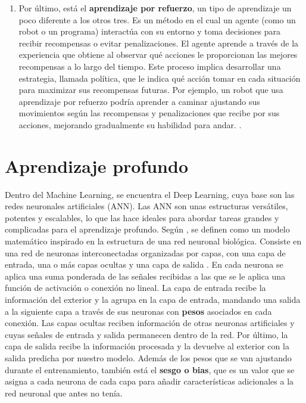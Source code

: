 \begin{enumerate}
	\item Por último, está el \textbf{aprendizaje por refuerzo}, un tipo de aprendizaje un poco diferente a los otros tres. Es un método en el cual un agente (como un robot o un programa) interactúa con su entorno y toma decisiones para recibir recompensas o evitar penalizaciones. El agente aprende a través de la experiencia que obtiene al observar qué acciones le proporcionan las mejores recompensas a lo largo del tiempo. Este proceso implica desarrollar una estrategia, llamada política, que le indica qué acción tomar en cada situación para maximizar sus recompensas futuras. Por ejemplo, un robot que usa aprendizaje por refuerzo podría aprender a caminar ajustando sus movimientos según las recompensas y penalizaciones que recibe por sus acciones, mejorando gradualmente su habilidad para andar. \citep{geron2022hands}.
\end{enumerate}


\section{Aprendizaje profundo}

Dentro del Machine Learning, se encuentra el Deep Learning, cuya base son las redes neuronales artificiales (ANN). Las ANN son unas estructuras versátiles, potentes y escalables, lo que las hace ideales para abordar tareas grandes y complicadas para el aprendizaje profundo. Según \citep{pajares2021aprendizaje}, se definen como un modelo matemático inspirado en la estructura de una red neuronal biológica. Consiste en una red de neuronas interconectadas organizadas por capas, con una capa de entrada, una o más capas ocultas y una capa de salida \citep{dolling2002artificial}. En cada neurona se aplica una suma ponderada de las señales recibidas a las que se le aplica una función de activación o conexión no lineal. La capa de entrada recibe la información del exterior y la agrupa en la capa de entrada, mandando una salida a la siguiente capa a través de sus neuronas con \textbf{pesos} asociados en cada conexión. Las capas ocultas reciben información de otras neuronas artificiales y cuyas señales de entrada y salida permanecen dentro de la red. Por último, la capa de salida recibe la información procesada y la devuelve al exterior con la salida predicha por nuestro modelo. Además de los pesos que se van ajustando durante el entrenamiento, también está el \textbf{sesgo o bias}, que es un valor que se asigna a cada neurona de cada capa para añadir características adicionales a la red neuronal que antes no tenía. 

